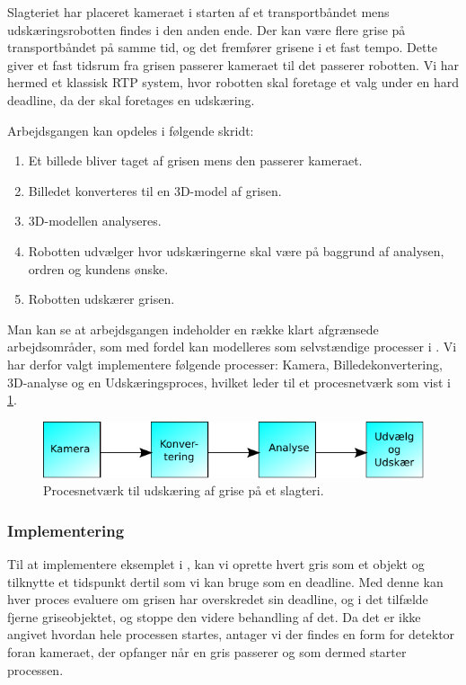Slagteriet har placeret kameraet i starten af et transportbåndet mens udskæringsrobotten findes i den anden ende. Der kan være flere grise på transportbåndet på samme tid, og det fremfører grisene i et fast tempo. Dette giver et fast tidsrum fra grisen passerer kameraet til det passerer robotten. Vi har hermed et klassisk RTP system, hvor robotten skal foretage et valg under en hard deadline, da der skal foretages en udskæring.

Arbejdsgangen kan opdeles i følgende skridt: 
\begin{enumerate}
\tightlist
	\item Et billede bliver taget af grisen mens den passerer kameraet.
	\item Billedet konverteres til en 3D-model af grisen.
	\item 3D-modellen analyseres.
	\item Robotten udvælger hvor udskæringerne skal være på baggrund af analysen, ordren og kundens ønske.
	\item Robotten udskærer grisen.
\end{enumerate}

Man kan se at arbejdsgangen indeholder en  række klart afgrænsede arbejdsområder, som med fordel kan modelleres som selvstændige processer i \pycsp.  Vi har derfor valgt implementere følgende processer: Kamera, Billedekonvertering, 3D-analyse og en Udskæringsproces, hvilket leder til et procesnetværk som vist i \cref{fig:pig-network}.

\begin{figure}
 \begin{center}
  \includegraphics[scale=1]{images/pig-network}
	\caption{Procesnetværk til udskæring af grise på et slagteri.}
	\label{fig:pig-network}
\end{center}
\end{figure}

\subsubsection*{Implementering}\label{sec:deadline-exampel-implementation}
Til at implementere eksemplet i \pycsp, kan vi oprette hvert gris som et objekt og tilknytte et tidspunkt dertil som vi kan bruge som en deadline. Med denne kan hver proces evaluere om grisen har overskredet sin deadline, og i det tilfælde fjerne griseobjektet, og stoppe den videre behandling af det. Da det er ikke angivet hvordan hele processen startes,  antager vi der findes en form for detektor foran kameraet, der opfanger når en gris passerer og som dermed starter processen. 

